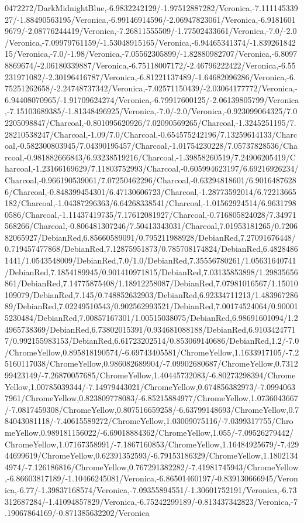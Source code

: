 {\begin{tikzternal}
0472272/DarkMidnightBlue,-6.9832242129/-1.97512887282/Veronica,-7.11114533927/-1.88490563195/Veronica,-6.99146914596/-2.06947823061/Veronica,-6.91816019679/-2.08776244419/Veronica,-7.26811555509/-1.77502433661/Veronica,-7.0/-2.0/Veronica,-7.09979761159/-1.53048915165/Veronica,-6.94465341374/-1.83926184215/Veronica,-7.0/-1.98/Veronica,-7.05562305899/-1.82880982707/Veronica,-6.80978869674/-2.06180339887/Veronica,-6.75118007172/-2.46796222422/Veronica,-6.55231971082/-2.30196416787/Veronica,-6.81221137489/-1.64682096286/Veronica,-6.75251262658/-2.24748737342/Veronica,-7.02571150439/-2.03064177772/Veronica,-6.94408070965/-1.91709624274/Veronica,-6.79917600125/-2.06139805799/Veronica,-7.15103689385/-1.81348496925/Veronica,-7.0/-2.0/Veronica,-0.923099064325/7.02205098847/Charcoal,-0.801095620926/7.02090569265/Charcoal,-1.3245251195/7.28210538247/Charcoal,-1.09/7.0/Charcoal,-0.654575242196/7.13259614133/Charcoal,-0.582300803945/7.04390195457/Charcoal,-1.01754230228/7.05737828536/Charcoal,-0.981882666843/6.93238519216/Charcoal,-1.39858260519/7.24906205419/Charcoal,-1.23166169629/7.11803752993/Charcoal,-0.605994623197/6.69216926234/Charcoal,-0.966190539061/7.07250462296/Charcoal,-0.63294818601/6.90164876286/Charcoal,-0.848399454301/6.47130606723/Charcoal,-1.28773592014/6.72213665182/Charcoal,-1.04387296363/6.64268338541/Charcoal,-1.01562924514/6.96317980586/Charcoal,-1.11437419735/7.17612081927/Charcoal,-0.716805824028/7.34971568266/Charcoal,-0.806481307246/7.50413343031/Charcoal,7.01953181265/0.720682065927/DebianRed,6.85660589091/0.795211988928/DebianRed,7.27091676448/0.719457477868/DebianRed,7.12875951873/0.785708174824/DebianRed,6.48284861441/1.0543548009/DebianRed,7.0/1.0/DebianRed,7.35556780261/1.05631640741/DebianRed,7.1854189945/0.901410971815/DebianRed,7.03135853898/1.29835656861/DebianRed,7.14775875408/1.18912258087/DebianRed,7.07981016567/1.15010109079/DebianRed,7.145/0.748852632903/DebianRed,6.92334711213/1.48396728689/DebianRed,7.02249510543/0.902562993521/DebianRed,7.00174524064/0.900015230484/DebianRed,7.00857167301/1.00515038075/DebianRed,6.98691601094/1.24965738369/DebianRed,6.73802015391/0.934681088188/DebianRed,6.91034247717/0.992155983153/DebianRed,6.61723202514/0.853069140686/DebianRed,1.2/-7.0/ChromeYellow,0.895818190574/-6.69743405581/ChromeYellow,1.1633917105/-7.25160117038/ChromeYellow,0.986082689904/-7.09902680687/ChromeYellow,0.731299423149/-7.26870057685/ChromeYellow,1.40445732083/-6.80273298394/ChromeYellow,1.00785039344/-7.14979443021/ChromeYellow,0.674856382973/-7.09940637961/ChromeYellow,0.823809778083/-6.85215884977/ChromeYellow,1.0736043667/-7.0817459308/ChromeYellow,0.807516659258/-6.63799148693/ChromeYellow,0.784043081118/-7.40615589272/ChromeYellow,1.03009075116/-7.0399317755/ChromeYellow,0.989181156022/-6.69018884362/ChromeYellow,1.055/-7.09526279442/ChromeYellow,1.07167358991/-7.1867160853/ChromeYellow,1.16484925679/-7.42944699619/ChromeYellow,0.62391352593/-6.79153186329/ChromeYellow,1.18021344974/-7.126186816/ChromeYellow,0.767291382282/-7.41981745943/ChromeYellow,-6.86603817189/-1.10466245081/Veronica,-6.86501460197/-0.839130666945/Veronica,-6.77/-1.39837168574/Veronica,-7.09355894551/-1.30601752191/Veronica,-6.73312687284/-1.41094857829/Veronica,-6.75242299189/-0.813437342823/Veronica,-7.19067864169/-0.871385632202/Veronica
\end{tikzternal}}
